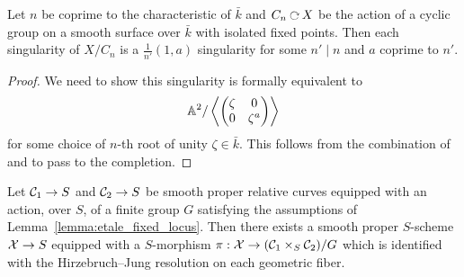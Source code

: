 \documentclass[main.tex]{subfiles}
\begin{document}
\begin{lemma} \label{lemma:is_cyclic_quotient}
Let $n$ be coprime to the characteristic of $\bar{k}$ and $C_n \acts X$ be the action of a cyclic group on a smooth surface over $\bar{k}$ with isolated fixed points. Then each singularity of $X / C_n$ is a $\frac{1}{n'}(1,a)$ singularity for some $n' \mid n$ and $a$ coprime to $n'$.
\end{lemma}

\begin{proof}
We need to show this singularity is formally equivalent to 
\[ \mathbb{A}^2 / \left< 
\begin{pmatrix}
\zeta & 0
\\
0 & \zeta^a
\end{pmatrix} \right> \]
for some choice of $n$-th root of unity $\zeta \in \bar{k}$. This follows from the combination of \cite[Proposition~2.4.8]{obus:wild_quotient} and \cite[Proposition~2.3.6]{obus:wild_quotient} to pass to the completion.
\end{proof}

\begin{prop} \label{prop:arithmetic_resolution}
Let $\mathcal{C}_1 \to S$ and $\mathcal{C}_2 \to S$ be smooth proper relative curves equipped with an action, over $S$, of a finite group $G$ satisfying the assumptions of Lemma~\ref{lemma:etale_fixed_locus}. Then there exists a smooth proper $S$-scheme $\mathcal{X} \to S$ equipped with a $S$-morphism $\pi : \mathcal{X} \to (\mathcal{C}_1 \times_S \mathcal{C}_2) / G$ which is identified with the Hirzebruch--Jung resolution on each geometric fiber. 
\end{prop}
\end{document}
